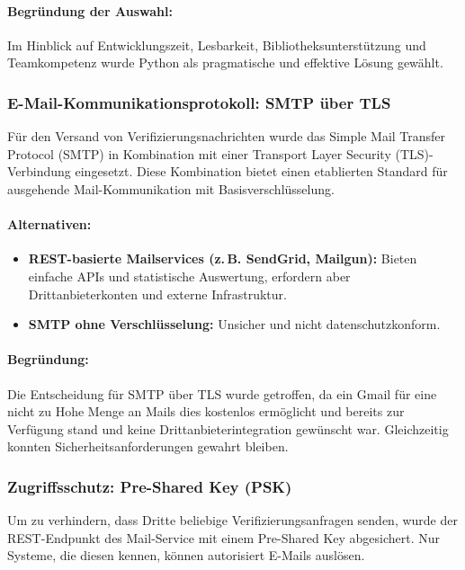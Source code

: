 \paragraph*{Begr\"undung der Auswahl:}

Im Hinblick auf Entwicklungszeit, Lesbarkeit, Bibliotheksunterst\"utzung und Teamkompetenz wurde Python als pragmatische und effektive L\"osung gew\"ahlt.

\subsubsection*{E-Mail-Kommunikationsprotokoll: SMTP \"uber TLS}

F\"ur den Versand von Verifizierungsnachrichten wurde das Simple Mail Transfer Protocol (SMTP) in Kombination mit einer Transport Layer Security (TLS)-Verbindung eingesetzt. Diese Kombination bietet einen etablierten Standard f\"ur ausgehende Mail-Kommunikation mit Basisverschl\"usselung.\cite{smtp_tls}

\paragraph*{Alternativen:}

\begin{itemize}
  \item \textbf{REST-basierte Mailservices (z.\,B. SendGrid, Mailgun):} Bieten einfache APIs und statistische Auswertung, erfordern aber Drittanbieterkonten und externe Infrastruktur.
  \item \textbf{SMTP ohne Verschl\"usselung:} Unsicher und nicht datenschutzkonform.
\end{itemize}

\paragraph*{Begr\"undung:}

Die Entscheidung f\"ur SMTP \"uber TLS wurde getroffen, da ein Gmail für eine nicht zu Hohe Menge an Mails dies kostenlos ermöglicht und bereits zur Verf\"ugung stand und keine Drittanbieterintegration gew\"unscht war. Gleichzeitig konnten Sicherheitsanforderungen gewahrt bleiben.

\subsubsection*{Zugriffsschutz: Pre-Shared Key (PSK)}

Um zu verhindern, dass Dritte beliebige Verifizierungsanfragen senden, wurde der REST-Endpunkt des Mail-Service mit einem Pre-Shared Key abgesichert. Nur Systeme, die diesen kennen, k\"onnen autorisiert E-Mails ausl\"osen.

